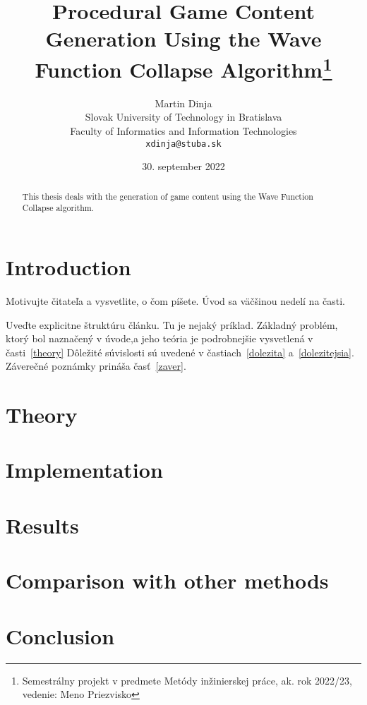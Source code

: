 \documentclass[10pt,twoside,a4paper]{article}
\title{Procedural Game Content Generation Using the Wave Function Collapse Algorithm\thanks{Semestrálny projekt v predmete Metódy inžinierskej práce, ak. rok 2022/23, vedenie: Meno Priezvisko}}
\author{Martin Dinja\\[2pt]
	{\small Slovak University of Technology in Bratislava}\\
	{\small Faculty of Informatics and Information Technologies}\\
	{\small \texttt{xdinja@stuba.sk}}
}
\date{\small 30. september 2022}
\begin{document}
\maketitle

\tableofcontents

\begin{abstract}
    \begin{center}
        This thesis deals with the generation of game content using the Wave Function Collapse algorithm. 
    \end{center}
\end{abstract}

\section{Introduction}\label{sec:introduction}

Motivujte čitateľa a vysvetlite, o čom píšete. Úvod sa väčšinou nedelí na časti.

Uveďte explicitne štruktúru článku. Tu je nejaký príklad.
Základný problém, ktorý bol naznačený v úvode,a jeho teória je podrobnejšie vysvetlená v časti~\ref*{theory}
Dôležité súvislosti sú uvedené v častiach~\ref{dolezita} a~\ref{dolezitejsia}.
Záverečné poznámky prináša časť~\ref{zaver}.

\section{Theory}\label{sec:theory}
\cite{BL22}
\cite{CHF20}
\cite{KLL+19}
\cite{LRGC22}
\cite{NMBP20}
\section{Implementation}\label{sec:implementation}
\section{Results}\label{sec:results}
\section{Comparison with other methods}\label{sec:comparison}
\section{Conclusion}\label{sec:conclusion}



\end{document}
